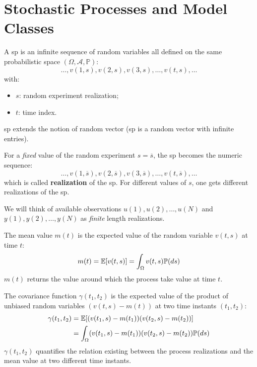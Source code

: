 \chapter{Stochastic Processes and Model Classes}
A \gls{sp} is an infinite sequence of random variables all defined on the same probabilistic space $(\Omega,\mathcal{A},\mathbb{P})$:
\[
	\ldots,v(1,s),v(2,s),v(3,s),\ldots,v(t,s),\ldots
\]
with:
\begin{itemize}
 	\item $s$: random experiment realization;
 	\item $t$: time index.
 \end{itemize}

\begin{obs}
	\gls{sp} extends the notion of random vector (\gls{sp} is a random vector with infinite entries).
\end{obs}

\begin{obs}
For a \emph{fixed} value of the random experiment $s = \overline{s}$, the \gls{sp} becomes the numeric sequence:
\[
	\ldots,v(1,\overline{s}),v(2,\overline{s}),v(3,\overline{s}),\ldots,v(t,\overline{s}),\ldots
\]
which is called \textbf{realization} of the \gls{sp}.
For different values of $s$, one gets different realizations of the \gls{sp}.
\end{obs}

We will think of available observations ${u(1),u(2),\ldots,u(N)}$ and ${y(1), y(2),\ldots, y(N)}$ as \emph{finite} length realizations.

\begin{definition}
	The mean value $m(t)$ is the expected value of the random variable $v(t,s)$ at time $t$:
	\[
		m(t)=\mathbb{E}[v(t, s)]=\int_{\Omega} v(t, s) \mathbb{P}(ds)
	\]
	$m(t)$ returns the value around which the process take value at time $t$.
\end{definition}

\begin{definition}
	The covariance function $\gamma(t_{1}, t_{2})$ is the expected value of the product of unbiased random variables $(v(t, s)-m(t))$ at two time instants $(t_{1}, t_{2})$:
	\begin{align*}
		\gamma(t_{1}, t_{2}) &=\mathbb{E}[(v(t_{1}, s)-m(t_{1}))(v(t_{2}, s)-m(t_{2}))] \\
		&=\int_{\Omega}(v(t_{1}, s)-m(t_{1}))(v(t_{2}, s)-m(t_{2})) \mathbb{P}(ds)
	\end{align*}
	$\gamma(t_{1}, t_{2})$ quantifies the relation existing between the process realizations and the mean value at two different time instants.
\end{definition}

